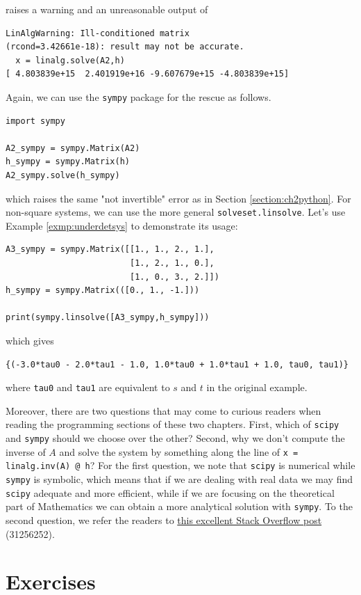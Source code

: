 raises a warning and an unreasonable output of
\begin{lstlisting}
LinAlgWarning: Ill-conditioned matrix 
(rcond=3.42661e-18): result may not be accurate.
  x = linalg.solve(A2,h)
[ 4.803839e+15  2.401919e+16 -9.607679e+15 -4.803839e+15]   
\end{lstlisting}
Again, we can use the \verb|sympy| package for the rescue as follows.
\begin{lstlisting}
import sympy

A2_sympy = sympy.Matrix(A2)
h_sympy = sympy.Matrix(h)
A2_sympy.solve(h_sympy)
\end{lstlisting}
which raises the same "not invertible" error as in Section \ref{section:ch2python}. For non-square systems, we can use the more general \verb|solveset.linsolve|. Let's use Example \ref{exmp:underdetsys} to demonstrate its usage:
\begin{lstlisting}
A3_sympy = sympy.Matrix([[1., 1., 2., 1.],
                         [1., 2., 1., 0.],
                         [1., 0., 3., 2.]])
h_sympy = sympy.Matrix(([0., 1., -1.]))

print(sympy.linsolve([A3_sympy,h_sympy]))    
\end{lstlisting}
which gives
\begin{lstlisting}
{(-3.0*tau0 - 2.0*tau1 - 1.0, 1.0*tau0 + 1.0*tau1 + 1.0, tau0, tau1)}    
\end{lstlisting}
where \verb|tau0| and \verb|tau1| are equivalent to $s$ and $t$ in the original example.\par
Moreover, there are two questions that may come to curious readers when reading the programming sections of these two chapters. First, which of \verb|scipy| and \verb|sympy| should we choose over the other? Second, why we don't compute the inverse of $A$ and solve the system by something along the line of \verb|x = linalg.inv(A) @ h|? For the first question, we note that \verb|scipy| is numerical while \verb|sympy| is symbolic, which means that if we are dealing with real data we may find \verb|scipy| adequate and more efficient, while if we are focusing on the theoretical part of Mathematics we can obtain a more analytical solution with \verb|sympy|. To the second question, we refer the readers to \href{https://stackoverflow.com/questions/31256252/why-does-numpy-linalg-solve-offer-more-precise-matrix-inversions-than-numpy-li}{this excellent Stack Overflow post} (31256252).
\section{Exercises}

